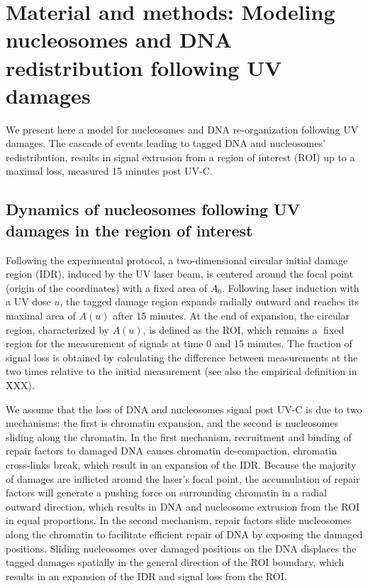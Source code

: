 \documentclass[12pt]{article}
\begin{document}
 \section{ Material and methods: Modeling nucleosomes and DNA redistribution following UV
		damages} 
	
	We present here a model for nucleosomes and DNA re-organization following
	UV damages. The cascade of events leading to tagged DNA and nucleosomes'
	redistribution, results in signal extrusion from a region of interest (ROI) up
	to a maximal loss, measured 15 minutes post UV-C.
	
	\subsection{Dynamics of nucleosomes following UV damages
		in the region of interest}
	
	Following the experimental protocol, a two-dimensional circular initial damage region (IDR), induced by the UV laser beam, is centered around the
	focal point (origin of the coordinates) with a fixed area of $A_0$. Following
	laser induction with a UV dose $u$, the tagged damage region expands radially outward and reaches its maximal area of $A(u)$ after 15 minutes. At
	the end of expansion, the circular region, characterized by $A(u)$, is defined
	as the ROI, which remains a fixed region for the measurement of signals at
	time 0 and 15 minutes. The fraction of signal loss is obtained by calculating
	the difference between measurements at the two times relative to the initial
	measurement (see also the empirical definition in XXX).
	
	We assume that the loss of DNA and nucleosomes signal post UV-C is due
	to two mechanisms: the first is chromatin expansion, and the second is nucleosomes sliding along the chromatin. In the first mechanism, recruitment and
	binding of repair factors to damaged DNA causes chromatin de-compaction, chromatin cross-links break, which result in an expansion of the 
	IDR. Because the majority of damages are inflicted around the laser's focal point, the accumulation of repair factors will generate a pushing force on
    surrounding chromatin in a radial outward direction, which results in DNA	
    and nucleosome extrusion from the ROI in equal proportions. In the second mechanism, repair factors slide nucleosomes along the chromatin to facilitate
    efficient repair of DNA by exposing the damaged positions. Sliding nucleosomes over damaged positions on the DNA displaces the tagged damages
    spatially in the general direction of the ROI boundary, which results in an
    expansion of the IDR and signal loss from the ROI.
\end{document}

